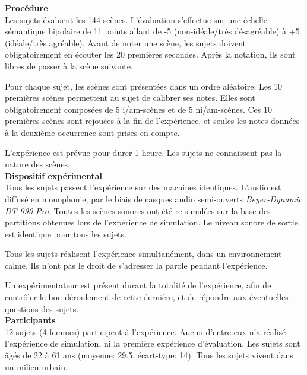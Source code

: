 {\setlength{\parindent}{0cm}\textbf{Procédure}} \\

Les sujets évaluent les 144 scènes. L'évaluation s'effectue sur une échelle sémantique bipolaire de 11 points allant de -5 (non-idéale/très désagréable) à +5 (idéale/très agréable). Avant de noter une scène, les sujets doivent obligatoirement en écouter les 20 premières secondes. Après la notation, ils sont libres de passer à la scène suivante.

Pour chaque sujet, les scènes sont présentées dans un ordre aléatoire. Les 10 premières scènes permettent au sujet de calibrer ses notes. Elles sont obligatoirement composées de 5 i/am-scènes et de 5 ni/am-scènes. Ces 10 premières scènes sont rejouées à la fin de l'expérience, et seules les notes données à la deuxième occurrence sont prises en compte. 

L'expérience est prévue pour durer 1 heure. Les sujets ne connaissent pas la nature des scènes.\\

{\setlength{\parindent}{0cm}\textbf{Dispositif expérimental}} \\

Tous les sujets passent l'expérience sur des machines identiques. L'audio est diffusé en monophonie, par le biais de casques audio semi-ouverts \emph{Beyer-Dynamic DT 990 Pro}. Toutes les scènes sonores ont été re-simulées sur la base des partitions obtenues lors de l'expérience de simulation. Le niveau sonore de sortie est identique pour tous les sujets.

 
Tous les sujets réalisent l'expérience simultanément, dans un environnement calme. Ils n'ont pas le droit de s'adresser la parole pendant l'expérience. 

Un expérimentateur est présent durant la totalité de l'expérience, afin de contrôler le bon déroulement de cette dernière, et de répondre aux éventuelles questions des sujets.  \\

{\setlength{\parindent}{0cm}\textbf{Participants}} \\

12 sujets (4 femmes) participent à l'expérience. Aucun d'entre eux n'a réalisé l'expérience de simulation, ni la première expérience d'évaluation. Les sujets sont âgés de 22 à 61 ans (moyenne: 29.5, écart-type: 14). Tous les sujets vivent dans un milieu urbain.

